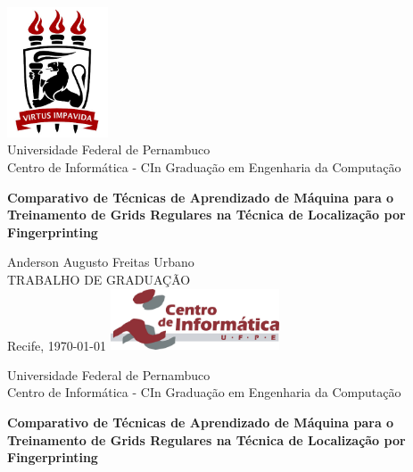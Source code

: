 \documentclass[12pt]{article}
\begin{document}
    \begin{titlepage}
    \begin{center}
    \includegraphics[width=3cm]{images/logoufpe.jpg}\\
    \large Universidade Federal de Pernambuco\\
    \large Centro de Informática - CIn
    \vskip1cm
    \large Graduação em Engenharia da Computação\\
    \vskip3cm
    
    {\textbf
        {\LARGE 
            Comparativo de Técnicas de Aprendizado de Máquina para o Treinamento de Grids Regulares na Técnica de Localização por Fingerprinting
        }
    }
    
    \vskip2cm

    \large Anderson Augusto Freitas Urbano\\
    \large TRABALHO DE GRADUAÇÃO\\
    \vskip2cm
    Recife, \today
    \vskip2cm
    \includegraphics[width=5cm]{images/logo-cin.jpg}    
    \end{center}
    \end{titlepage}
    
    \newpage
    \thispagestyle{empty}%
    \begin{center}
    \large Universidade Federal de Pernambuco\\
    \large Centro de Informática - CIn
    \vskip1cm
    \large Graduação em Engenharia da Computação\\
    \vskip3cm  
   
    {\textbf
        {\LARGE 
            Comparativo de Técnicas de Aprendizado de Máquina para o Treinamento de Grids Regulares na Técnica de Localização por Fingerprinting
        }
    }

    \end{center}
    \vskip4cm
   
\end{document}
